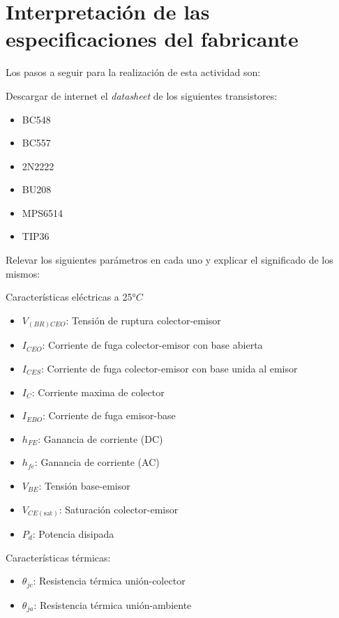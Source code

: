 \chapter{Interpretación de las especificaciones del fabricante}

Los pasos a seguir para la realización de esta actividad son:

Descargar de internet el \textit{datasheet} de los siguientes transistores:
    
\begin{itemize}
  \item BC548
  \item BC557
  \item 2N2222
  \item BU208
  \item MPS6514
  \item TIP36
\end{itemize}

Relevar los siguientes parámetros en cada uno y explicar el significado de los mismos:
    
Características eléctricas a 25$°C$
        \begin{itemize}
            \item $V_{(BR)CEO}$: Tensión de ruptura colector-emisor
            \item $I_{CEO}$: Corriente de fuga colector-emisor con base abierta
            \item $I_{CES}$: Corriente de fuga colector-emisor con base unida al emisor
            \item $I_C$: Corriente maxima de colector
            \item $I_{EBO}$: Corriente de fuga emisor-base
            \item $h_{FE}$: Ganancia de corriente (DC)
            \item $h_{fe}$: Ganancia de corriente (AC)
            \item $V_{BE}$: Tensión base-emisor
            \item $V_{CE(\text{sat})}$: Saturación colector-emisor
            \item $P_d$: Potencia disipada
        \end{itemize}

Características térmicas:

        \begin{itemize}
            \item $\theta_{jc}$: Resistencia térmica unión-colector
            \item $\theta_{ja}$: Resistencia térmica unión-ambiente
        \end{itemize}

